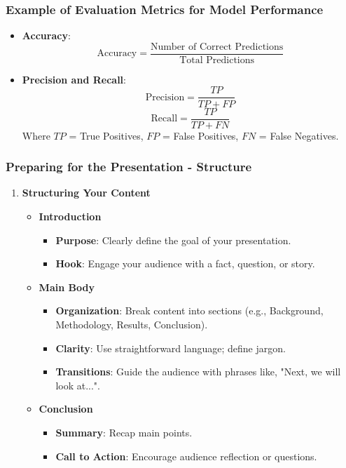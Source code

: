 \documentclass{beamer}
\begin{document}
\begin{frame}[fragile]
    \frametitle{Example of Evaluation Metrics for Model Performance}
    \begin{itemize}
        \item \textbf{Accuracy}: 
        \begin{equation}
        \text{Accuracy} = \frac{\text{Number of Correct Predictions}}{\text{Total Predictions}}
        \end{equation}
        \item \textbf{Precision and Recall}:
        \begin{equation}
        \text{Precision} = \frac{TP}{TP + FP}
        \end{equation}
        \begin{equation}
        \text{Recall} = \frac{TP}{TP + FN}
        \end{equation}
        Where \(TP\) = True Positives, \(FP\) = False Positives, \(FN\) = False Negatives.
    \end{itemize}
\end{frame}

\begin{frame}[fragile]
    \frametitle{Preparing for the Presentation - Structure}
    
    \begin{enumerate}
        \item \textbf{Structuring Your Content}
        \begin{itemize}
            \item \textbf{Introduction}
                \begin{itemize}
                    \item \textbf{Purpose}: Clearly define the goal of your presentation.
                    \item \textbf{Hook}: Engage your audience with a fact, question, or story.
                \end{itemize}
            \item \textbf{Main Body}
                \begin{itemize}
                    \item \textbf{Organization}: Break content into sections (e.g., Background, Methodology, Results, Conclusion).
                    \item \textbf{Clarity}: Use straightforward language; define jargon.
                    \item \textbf{Transitions}: Guide the audience with phrases like, "Next, we will look at...".
                \end{itemize}
            \item \textbf{Conclusion}
                \begin{itemize}
                    \item \textbf{Summary}: Recap main points.
                    \item \textbf{Call to Action}: Encourage audience reflection or questions.
                \end{itemize}
        \end{itemize}
    \end{enumerate}
\end{frame}
\end{document}
